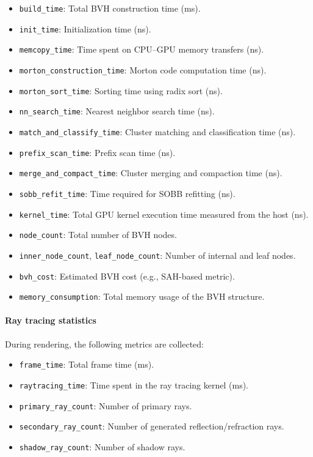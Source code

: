 \begin{itemize}
    \item \texttt{build\_time}: Total BVH construction time (ms).
    \item \texttt{init\_time}: Initialization time (ns).
    \item \texttt{memcopy\_time}: Time spent on CPU--GPU memory transfers (ns).
    \item \texttt{morton\_construction\_time}: Morton code computation time (ns).
    \item \texttt{morton\_sort\_time}: Sorting time using radix sort (ns).
    \item \texttt{nn\_search\_time}: Nearest neighbor search time (ns).
    \item \texttt{match\_and\_classify\_time}: Cluster matching and classification time (ns).
    \item \texttt{prefix\_scan\_time}: Prefix scan time (ns).
    \item \texttt{merge\_and\_compact\_time}: Cluster merging and compaction time (ns).
    \item \texttt{sobb\_refit\_time}: Time required for SOBB refitting (ns).
    \item \texttt{kernel\_time}: Total GPU kernel execution time measured from the host (ns).
    \item \texttt{node\_count}: Total number of BVH nodes.
    \item \texttt{inner\_node\_count}, \texttt{leaf\_node\_count}: Number of internal and leaf nodes.
    \item \texttt{bvh\_cost}: Estimated BVH cost (e.g., SAH-based metric).
    \item \texttt{memory\_consumption}: Total memory usage of the BVH structure.
\end{itemize}

\paragraph{Ray tracing statistics} During rendering, the following metrics are collected:

\begin{itemize}
    \item \texttt{frame\_time}: Total frame time (ms).
    \item \texttt{raytracing\_time}: Time spent in the ray tracing kernel (ms).
    \item \texttt{primary\_ray\_count}: Number of primary rays.
    \item \texttt{secondary\_ray\_count}: Number of generated reflection/refraction rays.
    \item \texttt{shadow\_ray\_count}: Number of shadow rays.
\end{itemize}

